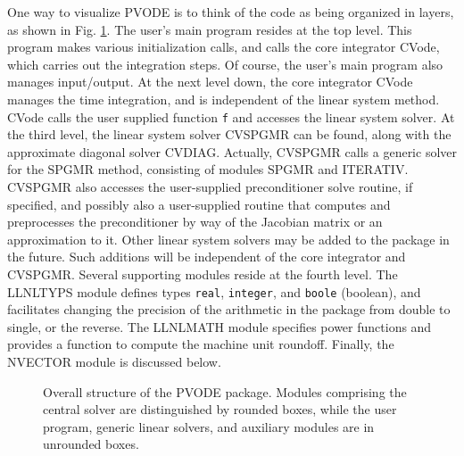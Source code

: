 One way to visualize PVODE is to think of the code as being organized
in layers, as shown in Fig. \ref{fig-pvorg}. The user's main program
resides at the top level. This program makes various initialization
calls, and calls the core integrator CVode, which carries out
the integration steps. Of course, the user's main program also manages
input/output. At the next level down, the core integrator CVode
manages the time integration, and is independent of the linear system
method.  CVode calls the user supplied function {\tt f} and
accesses the linear system solver. At the third level, the linear
system solver CVSPGMR can be found, along with the approximate
diagonal solver CVDIAG.  Actually, CVSPGMR calls a generic
solver for the SPGMR method, consisting of modules SPGMR and
ITERATIV.  CVSPGMR also accesses the user-supplied
preconditioner solve routine, if specified, and possibly also a
user-supplied routine that computes and preprocesses the
preconditioner by way of the Jacobian matrix or an approximation to
it. Other linear system solvers may be added to the package in the
future. Such additions will be independent of the core integrator and
CVSPGMR.  Several supporting modules reside at the fourth level.
The LLNLTYPS module defines types {\tt real}, {\tt integer}, and
{\tt boole} (boolean), and facilitates changing the precision of the
arithmetic in the package from double to single, or the reverse.  The
LLNLMATH module specifies power functions and provides a function to
compute the machine unit roundoff.  Finally, the NVECTOR module is
discussed below.

\begin{figure}[p]
\vspace{0.8in}
\caption{Overall structure of the PVODE package.
  Modules comprising the central solver are distinguished by rounded
  boxes, while the user program, generic linear solvers, and auxiliary
  modules are in unrounded boxes.} 
\label{fig-pvorg}
\end{figure}

